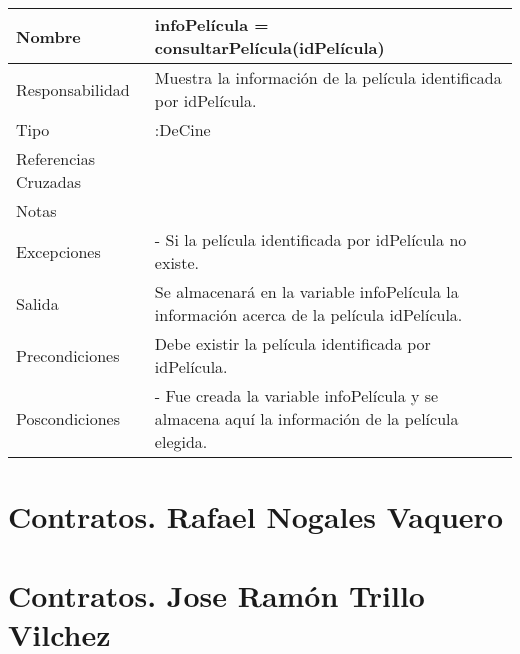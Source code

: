 \documentclass{article}
\begin{document}
\begin{table}[h]
\begin{tabular}{|l|l|l|l|l|l|}
\hline
\multicolumn{2}{|p{3cm}|}{Nombre} & \multicolumn{3}{p{8cm}|}{\textbf{infoPelícula = consultarPelícula(idPelícula)}}\\
\hline
\multicolumn{2}{|p{3cm}|}{Responsabilidad} & \multicolumn{4}{p{8cm}|}{Muestra la información de la película identificada por idPelícula.} \\
\hline
\multicolumn{2}{|p{3cm}|}{Tipo} & \multicolumn{4}{p{8cm}|}{:DeCine} \\
\hline
\multicolumn{2}{|p{3cm}|}{Referencias Cruzadas} & \multicolumn{4}{p{8cm}|}{} \\
\hline
\multicolumn{2}{|p{3cm}|}{Notas} & \multicolumn{4}{p{8cm}|}{} \\
\hline
\multicolumn{2}{|p{3cm}|}{Excepciones} & \multicolumn{4}{p{8cm}|}{-	Si la película identificada por idPelícula no existe.} \\
\hline
\multicolumn{2}{|p{3cm}|}{Salida} & \multicolumn{4}{p{8cm}|}{Se almacenará en la variable infoPelícula la información acerca de la película idPelícula.} \\
\hline
\multicolumn{2}{|p{3cm}|}{Precondiciones} & \multicolumn{4}{p{8cm}|}{Debe existir la película identificada por idPelícula.} \\
\hline
\multicolumn{2}{|p{3cm}|}{Poscondiciones} & \multicolumn{4}{p{8cm}|}{- Fue creada la variable infoPelícula y se almacena aquí la información de la película elegida.} \\
\hline
\end{tabular}
\end{table}

\section{Contratos. Rafael Nogales Vaquero}

\clearpage
\section{Contratos. Jose Ramón Trillo Vilchez}
\end{document}
